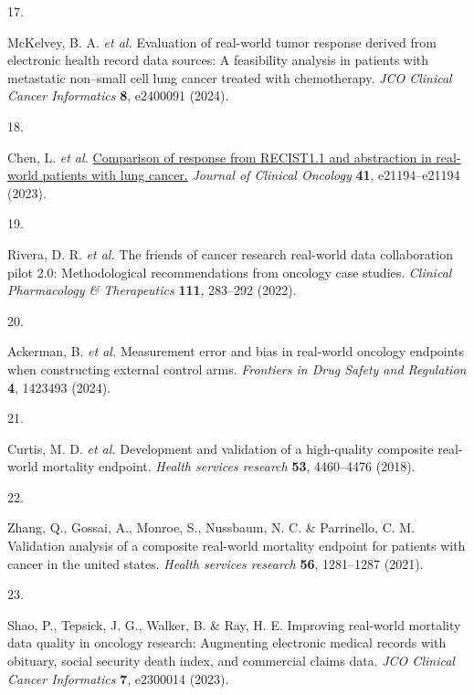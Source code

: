 \documentclass[
  letterpaper,
  DIV=11,
  numbers=noendperiod]{scrartcl}
\newlength{\cslhangindent}
\newlength{\csllabelwidth}
\newenvironment{CSLReferences}[2] %
 {\begin{list}{}{%
  \setlength{\itemindent}{0pt}
  \setlength{\leftmargin}{0pt}
  \setlength{\parsep}{0pt}
  \ifodd #1
   \setlength{\leftmargin}{\cslhangindent}
   \setlength{\itemindent}{-1\cslhangindent}
  \fi
  \setlength{\itemsep}{#2\baselineskip}}}
 {\end{list}}
\newcommand{\CSLLeftMargin}[1]{\parbox[t]{\csllabelwidth}{\strut#1\strut}}
\newcommand{\CSLRightInline}[1]{\parbox[t]{\linewidth - \csllabelwidth}{\strut#1\strut}}
\begin{document}
\begin{CSLReferences}{0}{0}
\CSLLeftMargin{17. }%
\CSLRightInline{McKelvey, B. A. \emph{et al.} Evaluation of real-world
tumor response derived from electronic health record data sources: A
feasibility analysis in patients with metastatic non--small cell lung
cancer treated with chemotherapy. \emph{JCO Clinical Cancer Informatics}
\textbf{8}, e2400091 (2024).}

\CSLLeftMargin{18. }%
\CSLRightInline{Chen, L. \emph{et al.}
\href{https://doi.org/10.1200/JCO.2023.41.16/_suppl.e21194}{Comparison
of response from RECIST1.1 and abstraction in real-world patients with
lung cancer.} \emph{Journal of Clinical Oncology} \textbf{41},
e21194--e21194 (2023).}

\CSLLeftMargin{19. }%
\CSLRightInline{Rivera, D. R. \emph{et al.} The friends of cancer
research real-world data collaboration pilot 2.0: Methodological
recommendations from oncology case studies. \emph{Clinical Pharmacology
\& Therapeutics} \textbf{111}, 283--292 (2022).}

\CSLLeftMargin{20. }%
\CSLRightInline{Ackerman, B. \emph{et al.} Measurement error and bias in
real-world oncology endpoints when constructing external control arms.
\emph{Frontiers in Drug Safety and Regulation} \textbf{4}, 1423493
(2024).}

\CSLLeftMargin{21. }%
\CSLRightInline{Curtis, M. D. \emph{et al.} Development and validation
of a high-quality composite real-world mortality endpoint. \emph{Health
services research} \textbf{53}, 4460--4476 (2018).}

\CSLLeftMargin{22. }%
\CSLRightInline{Zhang, Q., Gossai, A., Monroe, S., Nussbaum, N. C. \&
Parrinello, C. M. Validation analysis of a composite real-world
mortality endpoint for patients with cancer in the united states.
\emph{Health services research} \textbf{56}, 1281--1287 (2021).}

\CSLLeftMargin{23. }%
\CSLRightInline{Shao, P., Tepsick, J. G., Walker, B. \& Ray, H. E.
Improving real-world mortality data quality in oncology research:
Augmenting electronic medical records with obituary, social security
death index, and commercial claims data. \emph{JCO Clinical Cancer
Informatics} \textbf{7}, e2300014 (2023).}


\end{CSLReferences}
\end{document}
